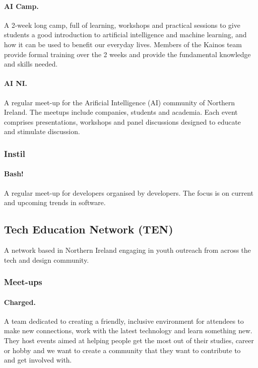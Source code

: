 \paragraph{AI Camp.} A 2-week long camp, full of learning, workshops and practical sessions to give students a good introduction to artificial intelligence and machine learning, and how it can be used to benefit our everyday lives. Members of the Kainos team provide formal training over the 2 weeks and provide the fundamental knowledge and skills needed.

\paragraph{AI NI.} A regular meet-up for the Arificial Intelligence (AI) community of Northern Ireland. The meetups include companies, students and academia. Each event comprises presentations, workshops and panel discussions designed to educate and stimulate discussion.

\subsubsection{Instil}

\paragraph{Bash!} A regular meet-up for developers organised by developers. The focus is on current and upcoming trends in software.

\subsection{Tech Education Network (TEN)}

A network based in Northern Ireland engaging in youth outreach from across the tech and design community.

\subsubsection{Meet-ups}

\paragraph{Charged.} A team dedicated to creating a friendly, inclusive environment for attendees to make new connections, work with the latest technology and learn something new. They host events aimed at helping people get the most out of their studies, career or hobby and we want to create a community that they want to contribute to and get involved with.

